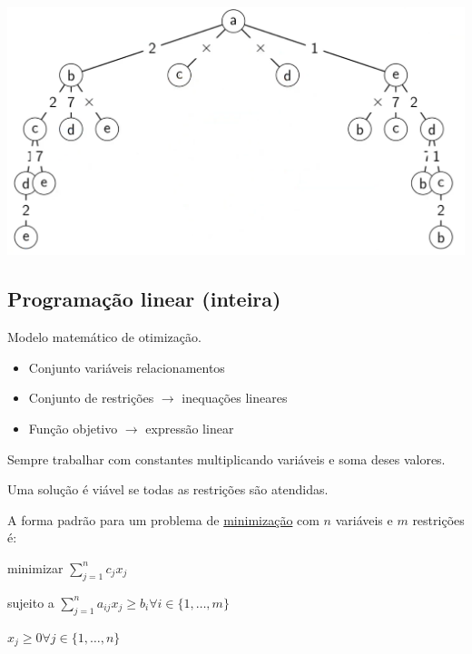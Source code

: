 \begin{example}
    \centering
    \includegraphics[width=.95\linewidth]{img/arvore_podada_tsp_final.png}
\end{example}

\subsection{Programação linear (inteira)}

Modelo matemático de otimização.

\begin{itemize}
    \item Conjunto variáveis relacionamentos
    \item Conjunto de restrições $\to$ inequações lineares
    \item Função objetivo $\to$ expressão linear
\end{itemize}

Sempre trabalhar com constantes multiplicando variáveis e soma deses valores.

Uma solução é viável se todas as restrições são atendidas.

\vspace{\baselineskip}

A forma padrão para um problema de \underline{minimização} com $n$ variáveis e $m$ restrições é:

\vspace{\baselineskip}

\begin{center}
    minimizar $\sum_{j=1}^{n}c_jx_j$

    sujeito a $\sum_{j=1}^{n}a_{ij}x_j \geq b_i \forall i \in \{1,\dots,m\}$

    $x_j \geq 0 \forall j \in \{1,\dots,n\}$
\end{center}

